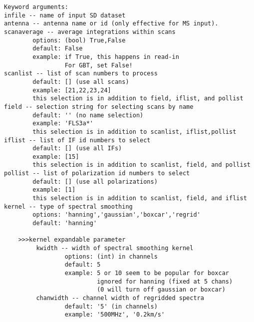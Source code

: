 \begin{verbatim}
Keyword arguments:
infile -- name of input SD dataset
antenna -- antenna name or id (only effective for MS input). 
scanaverage -- average integrations within scans
        options: (bool) True,False
        default: False
        example: if True, this happens in read-in
                 For GBT, set False!
scanlist -- list of scan numbers to process
        default: [] (use all scans)
        example: [21,22,23,24]
        this selection is in addition to field, iflist, and pollist
field -- selection string for selecting scans by name
        default: '' (no name selection)
        example: 'FLS3a*'
        this selection is in addition to scanlist, iflist,pollist
iflist -- list of IF id numbers to select
        default: [] (use all IFs)
        example: [15]
        this selection is in addition to scanlist, field, and pollist
pollist -- list of polarization id numbers to select
        default: [] (use all polarizations)
        example: [1]
        this selection is in addition to scanlist, field, and iflist
kernel -- type of spectral smoothing
        options: 'hanning','gaussian','boxcar','regrid'
        default: 'hanning'

    >>>kernel expandable parameter
         kwidth -- width of spectral smoothing kernel
                 options: (int) in channels 
                 default: 5
                 example: 5 or 10 seem to be popular for boxcar
                          ignored for hanning (fixed at 5 chans)
                          (0 will turn off gaussian or boxcar)
         chanwidth -- channel width of regridded spectra
                 default: '5' (in channels)
                 example: '500MHz', '0.2km/s'


\end{verbatim}
